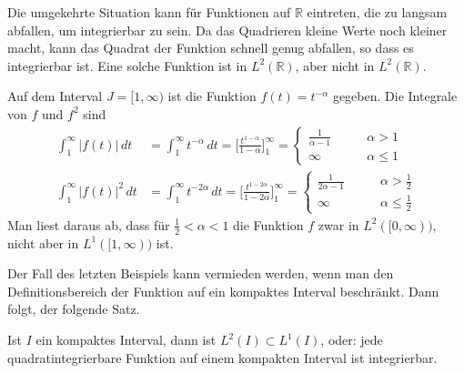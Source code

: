 Die umgekehrte Situation kann für Funktionen auf $\mathbb R$ eintreten,
die zu langsam abfallen, um integrierbar zu sein. 
Da das Quadrieren kleine Werte noch kleiner macht, kann das Quadrat
der Funktion schnell genug abfallen, so dass es integrierbar ist.
Eine solche Funktion ist in $L^2(\mathbb R)$, aber nicht in $L^2(\mathbb R)$.

\begin{beispiel}
Auf dem Interval $J=[1,\infty)$ ist die Funktion
$f(t)=t^{-\alpha}$ gegeben.
Die Integrale von $f$ und $f^2$ sind
\begin{align*}
\int_1^\infty |f(t)|\,dt
&=
\int_1^\infty t^{-\alpha}\,dt
=
\biggl[\frac{t^{1-\alpha}}{1-\alpha}\biggr]_1^\infty
=
\begin{cases}
\frac{1}{\alpha-1}&\qquad \alpha > 1\\
\infty &\qquad \alpha \le 1
\end{cases}
\\
\int_1^\infty |f(t)|^2\,dt
&=
\int_1^\infty t^{-2\alpha}\,dt
=
\biggl[\frac{t^{1-2\alpha}}{1-2\alpha}\biggr]_1^\infty
=
\begin{cases}
\frac{1}{2\alpha-1}&\qquad \alpha > \frac12\\
\infty &\qquad \alpha \le \frac12
\end{cases}
\end{align*}
Man liest daraus ab, dass für $\frac12<\alpha < 1$ die Funktion $f$ zwar
in $L^2([0,\infty))$, nicht aber in $L^1([1,\infty))$ ist.
\end{beispiel}

Der Fall des letzten Beispiels kann vermieden werden, wenn man den
Definitionsbereich der Funktion auf ein kompaktes Interval beschränkt.
Dann folgt, der folgende Satz.

\begin{satz}
\label{satz:l2inl1}
Ist $I$ ein kompaktes Interval, dann ist $L^2(I)\subset L^1(I)$, oder:
jede quadratintegrierbare Funktion auf einem kompakten Interval ist 
integrierbar.
\end{satz}

